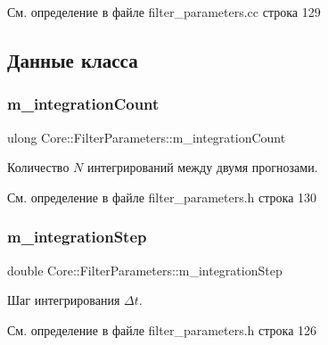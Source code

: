 См. определение в файле filter\+\_\+parameters.\+cc строка 129



\subsection{Данные класса}
\hypertarget{class_core_1_1_filter_parameters_af28ca1d6c952ad42a5dfbeb6a7e916e5}{}\label{class_core_1_1_filter_parameters_af28ca1d6c952ad42a5dfbeb6a7e916e5} 
\subsubsection{\texorpdfstring{m\+\_\+integration\+Count}{m\_integrationCount}}
{\footnotesize\ttfamily ulong Core\+::\+Filter\+Parameters\+::m\+\_\+integration\+Count\hspace{0.3cm}{\ttfamily [private]}}

Количество $N$ интегрирований между двумя прогнозами. 

См. определение в файле filter\+\_\+parameters.\+h строка 130

\hypertarget{class_core_1_1_filter_parameters_ab63c375a5b76a516da339b058af687ae}{}\label{class_core_1_1_filter_parameters_ab63c375a5b76a516da339b058af687ae} 
\subsubsection{\texorpdfstring{m\+\_\+integration\+Step}{m\_integrationStep}}
{\footnotesize\ttfamily double Core\+::\+Filter\+Parameters\+::m\+\_\+integration\+Step\hspace{0.3cm}{\ttfamily [private]}}

Шаг интегрирования $\Delta t$. 

См. определение в файле filter\+\_\+parameters.\+h строка 126

\hypertarget{class_core_1_1_filter_parameters_a5f906190ee024f4df75f8279e9986f2c}{}\label{class_core_1_1_filter_parameters_a5f906190ee024f4df75f8279e9986f2c} 

